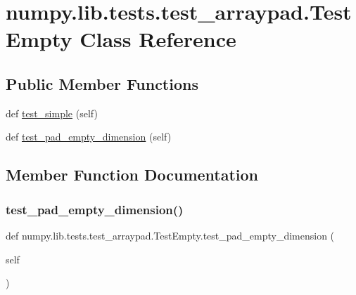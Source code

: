 \hypertarget{classnumpy_1_1lib_1_1tests_1_1test__arraypad_1_1TestEmpty}{}\section{numpy.\+lib.\+tests.\+test\+\_\+arraypad.\+Test\+Empty Class Reference}
\label{classnumpy_1_1lib_1_1tests_1_1test__arraypad_1_1TestEmpty}
\subsection*{Public Member Functions}
\begin{DoxyCompactItemize}
\item 
def \hyperlink{classnumpy_1_1lib_1_1tests_1_1test__arraypad_1_1TestEmpty_a490c2c15f89a54f1256ad9c55a209fcb}{test\+\_\+simple} (self)
\item 
def \hyperlink{classnumpy_1_1lib_1_1tests_1_1test__arraypad_1_1TestEmpty_a92b9396f945c387aadf929f8d6013d47}{test\+\_\+pad\+\_\+empty\+\_\+dimension} (self)
\end{DoxyCompactItemize}


\subsection{Member Function Documentation}
\mbox{\label{classnumpy_1_1lib_1_1tests_1_1test__arraypad_1_1TestEmpty_a92b9396f945c387aadf929f8d6013d47}} 
\subsubsection{\texorpdfstring{test\+\_\+pad\+\_\+empty\+\_\+dimension()}{test\_pad\_empty\_dimension()}}
{\footnotesize\ttfamily def numpy.\+lib.\+tests.\+test\+\_\+arraypad.\+Test\+Empty.\+test\+\_\+pad\+\_\+empty\+\_\+dimension (\begin{DoxyParamCaption}\item[{}]{self }\end{DoxyParamCaption})}

